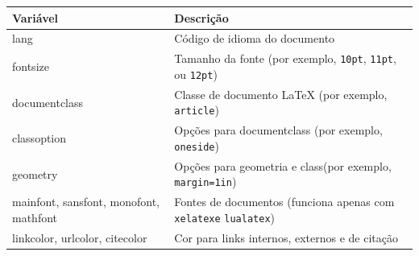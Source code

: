 \documentclass[
]{book}
\begin{document}
\begin{longtable}[]{@{}ll@{}}
\toprule
\begin{minipage}[b]{0.47\columnwidth}\raggedright
Variável\strut
\end{minipage} & \begin{minipage}[b]{0.47\columnwidth}\raggedright
Descrição\strut
\end{minipage}\tabularnewline
\midrule
\endhead
\begin{minipage}[t]{0.47\columnwidth}\raggedright
lang\strut
\end{minipage} & \begin{minipage}[t]{0.47\columnwidth}\raggedright
Código de idioma do documento \textbar{}\strut
\end{minipage}\tabularnewline
\begin{minipage}[t]{0.47\columnwidth}\raggedright
fontsize\strut
\end{minipage} & \begin{minipage}[t]{0.47\columnwidth}\raggedright
Tamanho da fonte (por exemplo, \texttt{10pt}, \texttt{11pt}, ou \texttt{12pt})\strut
\end{minipage}\tabularnewline
\begin{minipage}[t]{0.47\columnwidth}\raggedright
documentclass\strut
\end{minipage} & \begin{minipage}[t]{0.47\columnwidth}\raggedright
Classe de documento LaTeX (por exemplo, \texttt{article})\strut
\end{minipage}\tabularnewline
\begin{minipage}[t]{0.47\columnwidth}\raggedright
classoption\strut
\end{minipage} & \begin{minipage}[t]{0.47\columnwidth}\raggedright
Opções para documentclass (por exemplo, \texttt{oneside})\strut
\end{minipage}\tabularnewline
\begin{minipage}[t]{0.47\columnwidth}\raggedright
geometry\strut
\end{minipage} & \begin{minipage}[t]{0.47\columnwidth}\raggedright
Opções para geometria e class(por exemplo, \texttt{margin=1in})\strut
\end{minipage}\tabularnewline
\begin{minipage}[t]{0.47\columnwidth}\raggedright
mainfont, sansfont, monofont, mathfont\strut
\end{minipage} & \begin{minipage}[t]{0.47\columnwidth}\raggedright
Fontes de documentos (funciona apenas com \texttt{xelatexe} \texttt{lualatex})\strut
\end{minipage}\tabularnewline
\begin{minipage}[t]{0.47\columnwidth}\raggedright
linkcolor, urlcolor, citecolor\strut
\end{minipage} & \begin{minipage}[t]{0.47\columnwidth}\raggedright
Cor para links internos, externos e de citação\strut
\end{minipage}\tabularnewline
\bottomrule
\end{longtable}
\end{document}
